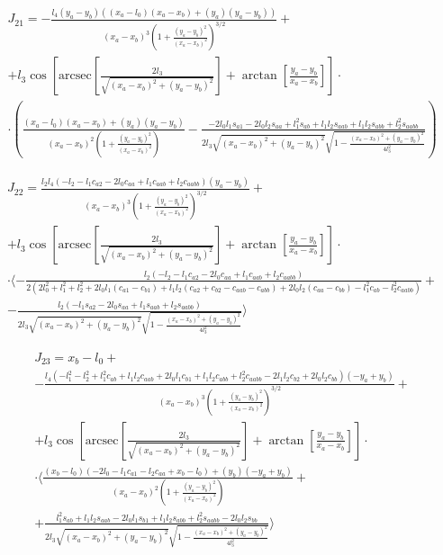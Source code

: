 \documentclass[printmode]{mgr}
\begin{document}
\begin{multline*}
J_{21} = 
 -\frac{l_4 (y_a - y_b) ((x_a - l_0) (x_a - x_b)+(y_a) (y_a - y_b))}{(x_a - x_b)^3 \left(1+\frac{(y_a - y_b)^2}{(x_a - x_b)^2}\right)^{3/2}}+\\
 +l_3 \cos\left[\text{arcsec}\left[\frac{2 l_3}{\sqrt{(x_a - x_b)^2+(y_a - y_b)^2}}\right]+\arctan\left[\frac{y_a - y_b}{x_a - x_b}\right]\right] \cdot
 \\
 \cdot \left(\frac{(x_a - l_0) (x_a - x_b)+(y_a) (y_a - y_b)}{(x_a - x_b)^2 \left(1+\frac{(y_a - y_b)^2}{(x_a - x_b)^2}\right)}-\frac{-2 l_0 l_1 s_{a1}-2 l_0 l_2 s_{aa}+l_1^2 s_{ab}+l_1 l_2 s_{aab}+l_1 l_2 s_{abb}+l_2^2 s_{aabb}}{2 l_3 \sqrt{(x_a - x_b)^2+(y_a - y_b)^2} \sqrt{1-\frac{(x_a - x_b)^2+(y_a - y_b)^2}{4 l_3^2}}}\right) 
\end{multline*}

\begin{multline*}
J_{22} = 
 \frac{l_2 l_4 (-l_2-l_1 c_{a2}-2 l_0 c_{aa}+l_1 c_{aab}+l_2 c_{aabb}) (y_a - y_b)}{(x_a - x_b)^3 \left(1+\frac{(y_a - y_b)^2}{(x_a - x_b)^2}\right)^{3/2}}+\\
 +l_3 \cos\left[\text{arcsec}\left[\frac{2 l_3}{\sqrt{(x_a - x_b)^2+(y_a - y_b)^2}}\right]+\arctan\left[\frac{y_a - y_b}{x_a - x_b}\right]\right] \cdot
 \\
 \cdot \langle-\frac{l_2 (-l_2-l_1 c_{a2}-2 l_0 c_{aa}+l_1 c_{aab}+l_2 c_{aabb})}{2 \left(2 l_0^2+l_1^2+l_2^2+2 l_0 l_1 (c_{a1}-c_{b1})+l_1 l_2 (c_{a2} + c_{b2} - c_{aab}-c_{abb})+2 l_0 l_2 (c_{aa}-c_{bb})-l_1^2 c_{ab}-l_2^2 c_{aabb}\right)}+
 \\
 -\frac{l_2 (-l_1 s_{a2}-2 l_0 s_{aa}+l_1 s_{aab}+l_2 s_{aabb})}{2 l_3 \sqrt{(x_a - x_b)^2+(y_a - y_b)^2} \sqrt{1-\frac{(x_a - x_b)^2+(y_a - y_b)^2}{4 l_3^2}}}\rangle
\end{multline*}

\begin{multline*}
J_{23} = 
 x_b - l_0+\\
 -\frac{l_4 \left(-l_1^2-l_2^2+l_1^2 c_{ab}+l_1 l_2 c_{aab}+2 l_0 l_1 c_{b1}+l_1 l_2 c_{abb}+l_2^2 c_{aabb}-2 l_1 l_2 c_{b2}+2 l_0 l_2 c_{bb}\right) (-y_a+y_b)}{(x_a - x_b)^3 \left(1+\frac{(y_a - y_b)^2}{(x_a - x_b)^2}\right)^{3/2}}+
 \\
 +l_3 \cos\left[\text{arcsec}\left[\frac{2 l_3}{\sqrt{(x_a - x_b)^2+(y_a - y_b)^2}}\right]+\arctan\left[\frac{y_a - y_b}{x_a - x_b}\right]\right] \cdot
 \\
 \cdot \langle\frac{(x_b - l_0) (-2 l_0-l_1 c_{a1}-l_2 c_{aa}+x_b - l_0)+(y_b) (-y_a+y_b)}{(x_a - x_b)^2 \left(1+\frac{(y_a - y_b)^2}{(x_a - x_b)^2}\right)}+\\
 +\frac{l_1^2 s_{ab}+l_1 l_2 s_{aab}-2 l_0 l_1 s_{b1}+l_1 l_2 s_{abb}+l_2^2 s_{aabb}-2 l_0 l_2 s_{bb}}{2 l_3 \sqrt{(x_a - x_b)^2+(y_a - y_b)^2} \sqrt{1-\frac{(x_a - x_b)^2+(y_a - y_b)^2}{4 l_3^2}}}\rangle 
\end{multline*}
\end{document}
